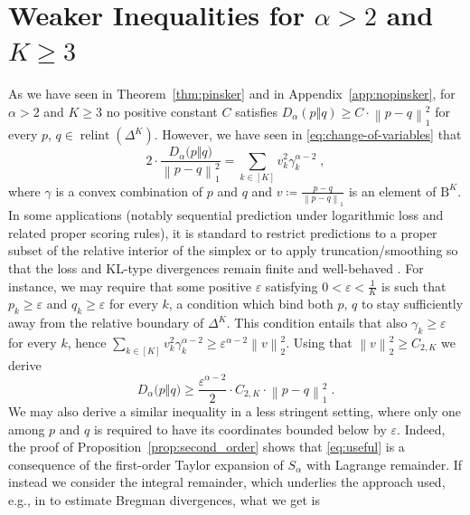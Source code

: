 \documentclass[11pt,oneside,a4paper]{article}
\newcommand{\e}{\varepsilon}
\newcommand{\lrb}[1]{\left(#1\right)}
\newcommand{\brb}[1]{\bigl(#1\bigr)}
\newcommand{\lno}[1]{\left\lVert#1\right\rVert}
\theoremstyle{plain}
\theoremstyle{definition}
\theoremstyle{remark}
\newcommand{\simplex}[1]{\Delta^{#1}}
\DeclareMathOperator*{\relint}{relint}
\newcommand{\tsphere}[1]{\mathrm{B}^{#1}}
\begin{document}
{\section{Weaker Inequalities for \texorpdfstring{$\alpha > 2$ and $K \ge 3$}{alpha > 2 and K >= 3}}
\label{app:clipping}
As we have seen in Theorem~\ref{thm:pinsker} and in Appendix~\ref{app:nopinsker}, for $\alpha > 2$ and $K \geq 3$ no positive constant $C$ satisfies
$D_\alpha(p \Vert q) \ge C \cdot \lno{ p-q }_1^2$
for every 
$p$, $q \in \relint{\lrb{\simplex{K}}}$.
However, we have seen in \eqref{eq:change-of-variables} that
\begin{equation}\label{eq:useful}
    2\cdot \frac{D_\alpha\brb{p\Vert q}}{\lno{p - q}_1^2}
=
    \sum_{k \in [K]} v_k^2 \gamma_k^{\alpha -2}\;,
\end{equation}
where $\gamma$ is a convex combination of $p$ and $q$ and $v \coloneq \frac{p - q}{\lno{p - q}_1}$ is an element of $\tsphere{K}$.
In some applications (notably sequential prediction under logarithmic loss and related proper scoring rules),
it is standard to restrict predictions to a proper subset of the relative interior of the simplex or to apply truncation/smoothing so that
the loss and KL-type divergences remain finite and well-behaved
\citep{cesa-bianchi-lugosi2006plg,cesa-bianchi-lugosi2001logloss,gneiting-raftery2007jasa,vanommen2016robust}.
For instance, we may require that some positive $\e$ satisfying $0 < \e < \frac{1}{K}$ is such that $p_k \ge \e$  and $q_k \ge \e$ for every $k$, a condition which bind both $p$, $q$ to stay sufficiently away from the relative boundary of $\simplex{K}$.
This condition entails that also $\gamma_k \ge \e$ for every $k$, hence
$\sum_{k \in [K]} v_k^2 \gamma_k^{\alpha -2} \ge \e^{\alpha - 2} \lno{v}_2^2$.
Using that $\lno{v}_2^2 \ge C_{2, K}$ we derive
\begin{equation}\label{eq:relaxed-pinsk-both}
    D_\alpha\brb{p\Vert q}
\ge
    \frac{\e^{\alpha - 2}}{2}
\cdot
    C_{2, K}
\cdot
    {\lno{p - q}_1^2}\;.
\end{equation}
We may also derive a similar inequality in a less stringent setting, where only one among $p$ and $q$ is required to have its coordinates bounded below by $\e$. Indeed, the proof of Proposition~\ref{prop:second_order} shows that \eqref{eq:useful} is a consequence of the first-order Taylor expansion of $S_{\alpha}$ with Lagrange remainder. If instead we consider the integral remainder, which underlies the approach used, e.g., in \cite{reid2009surrogate,reid2011information} to estimate Bregman divergences, what we get is 
}
\end{document}
